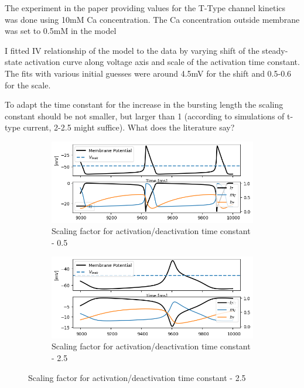 \documentclass[11pt]{article}
\begin{document}
The experiment in the paper providing values for the T-Type channel kinetics 
was done using 10mM Ca concentration. The Ca concentration outside membrane was
set to 0.5mM in the model

I fitted IV relationship of the model to the data by varying shift of the
steady-state activation curve along voltage axis and scale of the activation time
constant. The fits with various initial guesses were around 4.5mV for the shift and
0.5-0.6 for the scale.

To adapt the time constant for the increase in the bursting length the scaling
constant should be not smaller, but larger than 1 (according to simulations of t-type
current, 2-2.5 might suffice). What does the literature say?

\begin{figure}[H]
    \centering
    \begin{subfigure}[t]{0.45\textwidth}
        \centering
        \includegraphics[width=\textwidth]{./img/2025_01_15/simulation_0,5.png}
        \caption{Scaling factor for activation/deactivation time constant - 0.5}
    \end{subfigure}
    \hfill
    \begin{subfigure}[t]{0.45\textwidth}
        \centering
        \includegraphics[width=\textwidth]{./img/2025_01_15/simulation_2,5.png}
        \caption{Scaling factor for activation/deactivation time constant - 2.5}
    \end{subfigure}
\end{figure}
\end{document}
